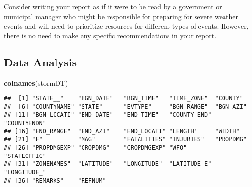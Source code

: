 \documentclass[]{article}
\newenvironment{Shaded}{\begin{snugshade}}{\end{snugshade}}
\newcommand{\KeywordTok}[1]{\textcolor[rgb]{0.13,0.29,0.53}{\textbf{#1}}}
\newcommand{\DataTypeTok}[1]{\textcolor[rgb]{0.13,0.29,0.53}{#1}}
\newcommand{\StringTok}[1]{\textcolor[rgb]{0.31,0.60,0.02}{#1}}
\newcommand{\CommentTok}[1]{\textcolor[rgb]{0.56,0.35,0.01}{\textit{#1}}}
\newcommand{\NormalTok}[1]{#1}
\begin{document}
Consider writing your report as if it were to be read by a government or
municipal manager who might be responsible for preparing for severe
weather events and will need to prioritize resources for different types
of events. However, there is no need to make any specific
recommendations in your report.

\subsection{Data Analysis}\label{data-analysis}

\begin{Shaded}
\end{Shaded}

\begin{Shaded}
\begin{Highlighting}[]
\KeywordTok{colnames}\NormalTok{(stormDT)}
\end{Highlighting}
\end{Shaded}

\begin{verbatim}
##  [1] "STATE__"    "BGN_DATE"   "BGN_TIME"   "TIME_ZONE"  "COUNTY"    
##  [6] "COUNTYNAME" "STATE"      "EVTYPE"     "BGN_RANGE"  "BGN_AZI"   
## [11] "BGN_LOCATI" "END_DATE"   "END_TIME"   "COUNTY_END" "COUNTYENDN"
## [16] "END_RANGE"  "END_AZI"    "END_LOCATI" "LENGTH"     "WIDTH"     
## [21] "F"          "MAG"        "FATALITIES" "INJURIES"   "PROPDMG"   
## [26] "PROPDMGEXP" "CROPDMG"    "CROPDMGEXP" "WFO"        "STATEOFFIC"
## [31] "ZONENAMES"  "LATITUDE"   "LONGITUDE"  "LATITUDE_E" "LONGITUDE_"
## [36] "REMARKS"    "REFNUM"
\end{verbatim}
\end{document}
